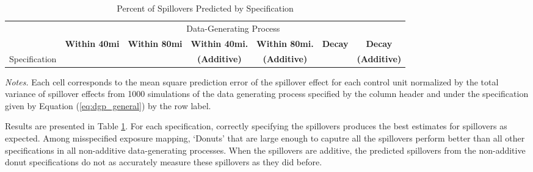 \documentclass[11pt]{article}
\begin{document}
\begin{table}[!tb]
    \caption{Percent of Spillovers Predicted by Specification}
    \label{tab:misspecification_mspe}

    \begin{adjustbox}{width = 1.1\textwidth, center}
        \begin{threeparttable}
            \begin{tabular}{@{} l rrrrrr @{}}
                \toprule
                & \multicolumn{6}{c}{Data-Generating Process} \\
                \cmidrule{2-7}

                & \multicolumn{1}{c}{\textbf{Within 40mi}} & \multicolumn{1}{c}{\textbf{Within 80mi}} & \multicolumn{1}{c}{\textbf{Within 40mi.}} & \multicolumn{1}{c}{\textbf{Within 80mi.}} & \multicolumn{1}{c}{\textbf{Decay}} & \multicolumn{1}{c}{\textbf{Decay}} \\
                Specification & & & \multicolumn{1}{c}{\textbf{(Additive)}} & \multicolumn{1}{c}{\textbf{(Additive)}} & & \multicolumn{1}{c}{\textbf{(Additive)}} \\
 
                \midrule
                
                
                
                
                \bottomrule
            \end{tabular}
            
            \begin{tablenotes}\footnotesize
                \item \textit{Notes.} Each cell corresponds to the mean square prediction error of the spillover effect for each control unit normalized by the total variance of spillover effects from 1000 simulations of the data generating process specified by the column header and under the specification given by Equation (\ref{eq:dgp_general}) by the row label. 
            \end{tablenotes}
        \end{threeparttable}
    \end{adjustbox}
\end{table}

Results are presented in Table \ref{tab:misspecification_mspe}. For each specification, correctly specifying the spillovers produces the best estimates for spillovers as expected. Among misspecified exposure mapping, `Donuts' that are large enough to caputre all the spillovers perform better than all other specifications in all non-additive data-generating processes. When the spillovers are additive, the predicted spillovers from the non-additive donut specifications do not as accurately measure these spillovers as they did before. 
\end{document}
